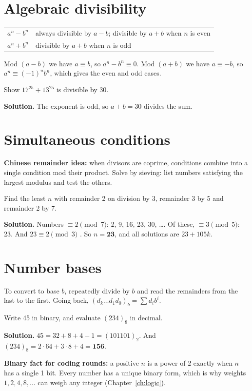 \documentclass[11pt,a4paper,openany]{report}
\begin{document}
\section{Algebraic divisibility}
\begin{center}
\begin{tabular}{ll}
\toprule
$a^n-b^n$ & always divisible by $a-b$; divisible by $a+b$ when $n$ is even\\
$a^n+b^n$ & divisible by $a+b$ when $n$ is odd\\
\bottomrule
\end{tabular}
\end{center}
\begin{why}
Mod $(a-b)$ we have $a\equiv b$, so $a^n-b^n\equiv0$. Mod $(a+b)$ we have $a\equiv-b$, so $a^n\equiv(-1)^nb^n$, which gives the even and odd cases.
\end{why}
\begin{example}
Show $17^{25}+13^{25}$ is divisible by 30.

\textbf{Solution.} The exponent is odd, so $a+b=30$ divides the sum.
\end{example}

\section{Simultaneous conditions}
\textbf{Chinese remainder idea:} when divisors are coprime, conditions combine into a single condition mod their product. Solve by sieving: list numbers satisfying the largest modulus and test the others.
\begin{example}
Find the least $n$ with remainder 2 on division by 3, remainder 3 by 5 and remainder 2 by 7.

\textbf{Solution.} Numbers $\equiv2\pmod7$: 2, 9, 16, 23, 30, \dots. Of these, $\equiv3\pmod5$: 23. And $23\equiv2\pmod3$ \checkmark. So $n=\mathbf{23}$, and all solutions are $23+105k$.
\end{example}

\section{Number bases}
To convert to base $b$, repeatedly divide by $b$ and read the remainders from the last to the first. Going back, $(d_k\dots d_1d_0)_b=\sum d_ib^i$.
\begin{example}
Write 45 in binary, and evaluate $(234)_8$ in decimal.

\textbf{Solution.} $45=32+8+4+1=(101101)_2$. And $(234)_8=2\cdot64+3\cdot8+4=\mathbf{156}$.
\end{example}
\textbf{Binary fact for coding rounds:} a positive $n$ is a power of 2 exactly when $n$ has a single 1 bit. Every number has a unique binary form, which is why weights $1,2,4,8,\dots$ can weigh any integer (Chapter~\ref{ch:logic}).
\end{document}
